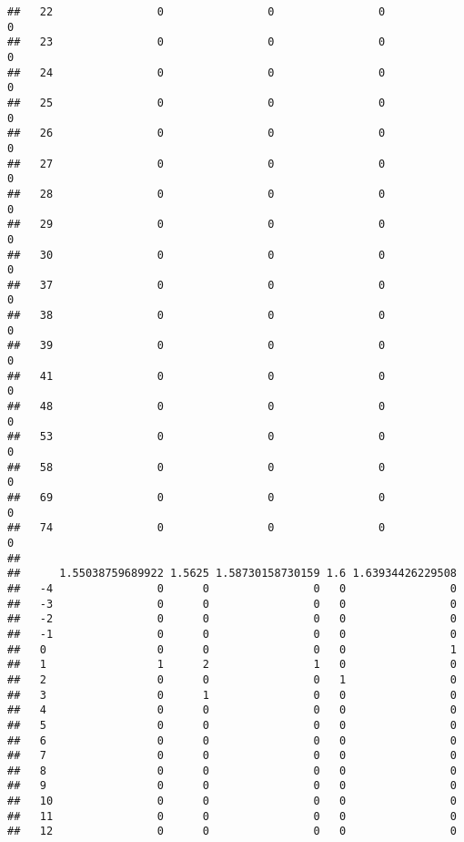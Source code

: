 \documentclass[]{article}
\begin{document}
\begin{verbatim}
##   22                0                0                0                0
##   23                0                0                0                0
##   24                0                0                0                0
##   25                0                0                0                0
##   26                0                0                0                0
##   27                0                0                0                0
##   28                0                0                0                0
##   29                0                0                0                0
##   30                0                0                0                0
##   37                0                0                0                0
##   38                0                0                0                0
##   39                0                0                0                0
##   41                0                0                0                0
##   48                0                0                0                0
##   53                0                0                0                0
##   58                0                0                0                0
##   69                0                0                0                0
##   74                0                0                0                0
##     
##      1.55038759689922 1.5625 1.58730158730159 1.6 1.63934426229508
##   -4                0      0                0   0                0
##   -3                0      0                0   0                0
##   -2                0      0                0   0                0
##   -1                0      0                0   0                0
##   0                 0      0                0   0                1
##   1                 1      2                1   0                0
##   2                 0      0                0   1                0
##   3                 0      1                0   0                0
##   4                 0      0                0   0                0
##   5                 0      0                0   0                0
##   6                 0      0                0   0                0
##   7                 0      0                0   0                0
##   8                 0      0                0   0                0
##   9                 0      0                0   0                0
##   10                0      0                0   0                0
##   11                0      0                0   0                0
##   12                0      0                0   0                0

\end{verbatim}
\end{document}

